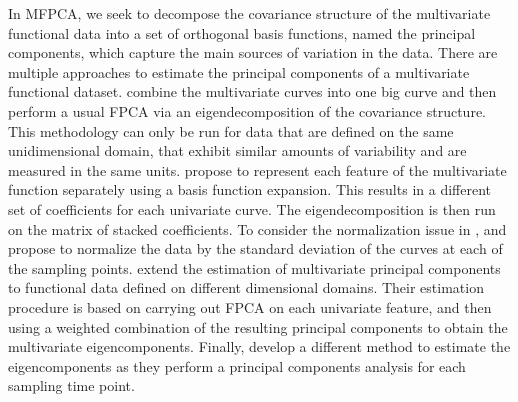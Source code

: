 \documentclass[times,sort&compress,3p]{elsarticle}
\theoremstyle{plain}%
\theoremstyle{definition}
\begin{document}
In MFPCA, we seek to decompose the covariance structure of the multivariate functional data into a set of orthogonal basis functions, named the principal components, which capture the main sources of variation in the data. There are multiple approaches to estimate the principal components of a multivariate functional dataset. \citet{ramsayFunctionalDataAnalysis2005} combine the multivariate curves into one big curve and then perform a usual FPCA via an eigendecomposition of the covariance structure. This methodology can only be run for data that are defined on the same unidimensional domain, that exhibit similar amounts of variability and are measured in the same units. \citet{jacquesModelbasedClusteringMultivariate2014a} propose to represent each feature of the multivariate function separately using a basis function expansion. This results in a different set of coefficients for each univariate curve. The eigendecomposition is then run on the matrix of stacked coefficients. To consider the normalization issue in \cite{ramsayFunctionalDataAnalysis2005}, \citet{chiouMultivariateFunctionalPrincipal2014} and \citet{jacquesModelbasedClusteringMultivariate2014a} propose to normalize the data by the standard deviation of the curves at each of the sampling points. \citet{happMultivariateFunctionalPrincipal2018a} extend the estimation of multivariate principal components to functional data defined on different dimensional domains. Their estimation procedure is based on carrying out FPCA on each univariate feature, and then using a weighted combination of the resulting principal components to obtain the multivariate eigencomponents. Finally, \citet{berrenderoPrincipalComponentsMultivariate2011} develop a different method to estimate the eigencomponents as they perform a principal components analysis for each sampling time point.
\end{document}
